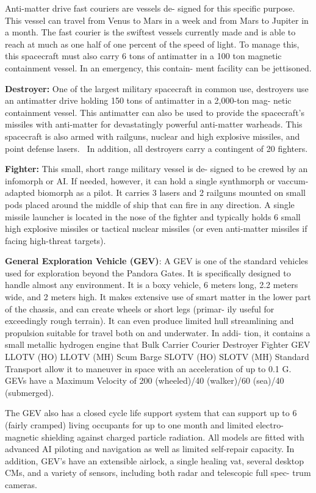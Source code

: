Anti-matter drive fast couriers are vessels de-
signed for this specific purpose. This vessel can 
travel from Venus to Mars in a week and from 
Mars to Jupiter in a month. The fast courier is the 
swiftest vessels currently made and is able to reach 
at much as one half of one percent of the speed 
of light. To manage this, this spacecraft must also 
carry 6 tons of antimatter in a 100 ton magnetic 
containment vessel. In an emergency, this contain-
ment facility can be jettisoned.

\textbf{Destroyer:} One of the largest military spacecraft 
in common use, destroyers use an antimatter drive 
holding 150 tons of antimatter in a 2,000-ton mag-
netic containment vessel. This antimatter can also 
be used to provide the spacecraft's missiles with 
anti-matter for devastatingly powerful anti-matter 
warheads. This spacecraft is also armed with 
railguns, nuclear and high explosive missiles, and 
point defense lasers.  In addition, all destroyers 
carry a contingent of 20 fighters.

\textbf{Fighter: }This small, short range military vessel is de-
signed to be crewed by an infomorph or AI. If needed, 
however, it can hold a single synthmorph or vaccum-
adapted biomorph as a pilot. It carries 3 lasers and 2 
railguns mounted on small pods placed around the 
middle of ship that can fire in any direction. A single 
missile launcher is located in the nose of the fighter 
and typically holds 6 small high explosive missiles or 
tactical nuclear missiles (or even anti-matter missiles 
if facing high-threat targets).

\textbf{General Exploration Vehicle (GEV)}: A GEV is one 
of the standard vehicles used for exploration beyond 
the Pandora Gates. It is specifically designed to handle 
almost any environment. It is a boxy vehicle, 6 meters 
long, 2.2 meters wide, and 2 meters high. It makes 
extensive use of smart matter in the lower part of the 
chassis, and can create wheels or short legs (primar-
ily useful for exceedingly rough terrain). It can even 
produce limited hull streamlining and propulsion 
suitable for travel both on and underwater. In addi-
tion, it contains a small metallic hydrogen engine that 
Bulk Carrier
Courier
Destroyer
Fighter
GEV
LLOTV (HO)
LLOTV (MH)
Scum Barge
SLOTV (HO)
SLOTV (MH)
Standard Transport
allow it to maneuver in space with an acceleration of 
up to 0.1 G. GEVs have a Maximum Velocity of 200 
(wheeled)/40 (walker)/60 (sea)/40 (submerged).

The GEV also has a closed cycle life support system 
that can support up to 6 (fairly cramped) living 
occupants for up to one month and limited electro-
magnetic shielding against charged particle radiation. 
All models are fitted with advanced AI piloting and 
navigation as well as limited self-repair capacity. In 
addition, GEV's have an extensible airlock, a single 
healing vat, several desktop CMs, and a variety of 
sensors, including both radar and telescopic full spec-
trum cameras.

